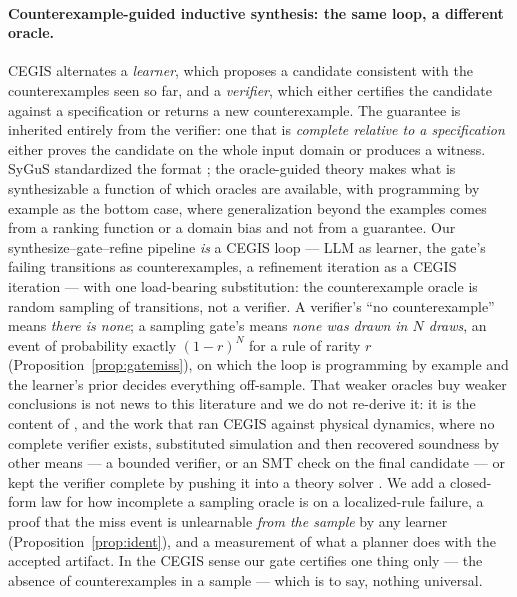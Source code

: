 
\paragraph{Counterexample-guided inductive synthesis: the same loop, a different oracle.}
CEGIS \citep{solarlezama2006sketching,solarlezama2008thesis} alternates a \emph{learner}, which proposes a candidate consistent with the counterexamples seen so far, and a \emph{verifier}, which either certifies the candidate against a specification or returns a new counterexample. The guarantee is inherited entirely from the verifier: one that is \emph{complete relative to a specification} either proves the candidate on the whole input domain or produces a witness. SyGuS standardized the format \citep{alur2013sygus}; the oracle-guided theory \citep{jha2010oracle,jha2017theory} makes what is synthesizable a function of which oracles are available, with programming by example \citep{gulwani2011flashfill,gulwani2017synthesis} as the bottom case, where generalization beyond the examples comes from a ranking function or a domain bias and not from a guarantee. Our synthesize--gate--refine pipeline \emph{is} a CEGIS loop --- LLM as learner, the gate's failing transitions as counterexamples, a refinement iteration as a CEGIS iteration --- with one load-bearing substitution: the counterexample oracle is random sampling of transitions, not a verifier. A verifier's ``no counterexample'' means \emph{there is none}; a sampling gate's means \emph{none was drawn in $N$ draws}, an event of probability exactly $(1-r)^N$ for a rule of rarity $r$ (Proposition~\ref{prop:gatemiss}), on which the loop is programming by example and the learner's prior decides everything off-sample. That weaker oracles buy weaker conclusions is not news to this literature and we do not re-derive it: it is the content of \citet{jha2017theory}, and the work that ran CEGIS against physical dynamics, where no complete verifier exists, substituted simulation and then recovered soundness by other means --- a bounded verifier, or an SMT check on the final candidate \citep{kapinski2014simulation,ravanbakhsh2019clf} --- or kept the verifier complete by pushing it into a theory solver \citep{abate2018cegist}. We add a closed-form law for how incomplete a sampling oracle is on a localized-rule failure, a proof that the miss event is unlearnable \emph{from the sample} by any learner (Proposition~\ref{prop:ident}), and a measurement of what a planner does with the accepted artifact. In the CEGIS sense our gate certifies one thing only --- the absence of counterexamples in a sample --- which is to say, nothing universal.

